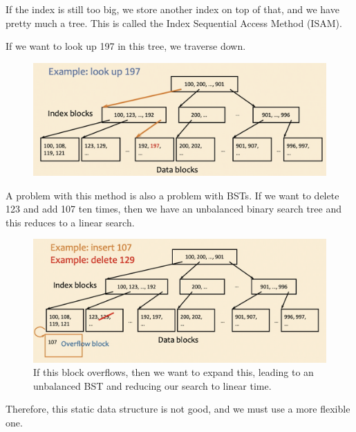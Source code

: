 \documentclass{article}
\begin{document}
    If the index is still too big, we store another index on top of that, and we have pretty much a tree. This is called the Index Sequential Access Method (ISAM). 
    
    \begin{example}
      If we want to look up 197 in this tree, we traverse down. 

      \begin{figure}[H]
        \centering 
        \includegraphics[scale=0.4]{img/isam_lookup.png}
        \caption{} 
        \label{fig:isam_lookup}
      \end{figure}
    \end{example}

    A problem with this method is also a problem with BSTs. If we want to delete 123 and add 107 ten times, then we have an unbalanced binary search tree and this reduces to a linear search. 

    \begin{figure}[H]
      \centering 
      \includegraphics[scale=0.4]{img/isam_problem.png}
      \caption{If this block overflows, then we want to expand this, leading to an unbalanced BST and reducing our search to linear time.} 
      \label{fig:isam_problem}
    \end{figure}
    
    Therefore, this static data structure is not good, and we must use a more flexible one. 
\end{document}
